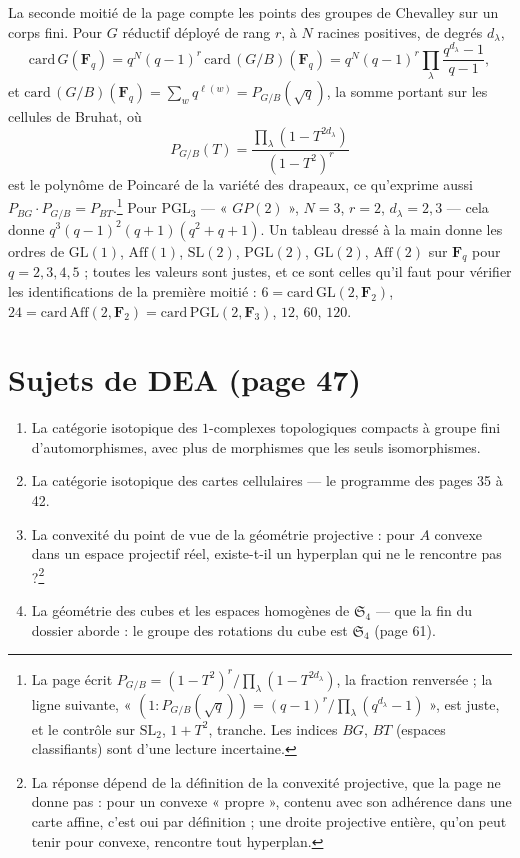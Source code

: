 \documentclass[11pt,a4paper]{article}
\begin{document}
La seconde moitié de la page compte les points des groupes de Chevalley sur
un corps fini. Pour $G$ réductif déployé de rang $r$, à $N$ racines
positives, de degrés $d_\lambda$,
\[
  \mathrm{card}\, G(\mathbf{F}_q) = q^N (q-1)^r \,\mathrm{card}\,
  (G/B)(\mathbf{F}_q) = q^N (q-1)^r \prod_\lambda \frac{q^{d_\lambda} -
  1}{q - 1} ,
\]
et $\mathrm{card}\,(G/B)(\mathbf{F}_q) = \sum_w q^{\ell(w)} =
P_{G/B}(\sqrt{q})$, la somme portant sur les cellules de Bruhat, où
\[
  P_{G/B}(T) = \frac{\prod_\lambda (1 - T^{2d_\lambda})}{(1 - T^2)^r}
\]
est le polynôme de Poincaré de la variété des drapeaux, ce qu'exprime aussi
$P_{BG} \cdot P_{G/B} = P_{BT}$.\footnote{La page écrit $P_{G/B} = (1 -
T^2)^r / \prod_\lambda (1 - T^{2d_\lambda})$, la fraction renversée ; la
ligne suivante, « $(1 : P_{G/B}(\sqrt{q})) = (q-1)^r/\prod_\lambda
(q^{d_\lambda} - 1)$ », est juste, et le contrôle sur $\mathrm{SL}_2$, $1 +
T^2$, tranche. Les indices $BG$, $BT$ (espaces classifiants) sont d'une
lecture incertaine.} Pour $\mathrm{PGL}_3$ --- « $GP(2)$ », $N = 3$, $r = 2$,
$d_\lambda = 2, 3$ --- cela donne $q^3(q-1)^2(q+1)(q^2+q+1)$. Un tableau
dressé à la main donne les ordres de $\mathrm{GL}(1)$, $\mathrm{Aff}(1)$,
$\mathrm{SL}(2)$, $\mathrm{PGL}(2)$, $\mathrm{GL}(2)$, $\mathrm{Aff}(2)$ sur
$\mathbf{F}_q$ pour $q = 2, 3, 4, 5$ ; toutes les valeurs sont justes, et ce
sont celles qu'il faut pour vérifier les identifications de la première
moitié : $6 = \mathrm{card}\, \mathrm{GL}(2, \mathbf{F}_2)$, $24 =
\mathrm{card}\, \mathrm{Aff}(2, \mathbf{F}_2) = \mathrm{card}\, \mathrm{PGL}(2,
\mathbf{F}_3)$, $12$, $60$, $120$.

\section*{Sujets de DEA (page 47)}

\begin{enumerate}
  \item[1)] La catégorie isotopique des $1$-complexes topologiques compacts
  à groupe fini d'automorphismes, avec plus de morphismes que les seuls
  isomorphismes.
  \item[2)] La catégorie isotopique des cartes cellulaires --- le programme
  des pages 35 à 42.
  \item[3)] La convexité du point de vue de la géométrie projective : pour
  $A$ convexe dans un espace projectif réel, existe-t-il un hyperplan qui ne
  le rencontre pas ?\footnote{La réponse dépend de la définition de la
  convexité projective, que la page ne donne pas : pour un convexe
  « propre », contenu avec son adhérence dans une carte affine, c'est oui par
  définition ; une droite projective entière, qu'on peut tenir pour convexe,
  rencontre tout hyperplan.}
  \item[4)] La géométrie des cubes et les espaces homogènes de
  $\mathfrak{S}_4$ --- que la fin du dossier aborde : le groupe des rotations
  du cube est $\mathfrak{S}_4$ (page 61).
\end{enumerate}
\end{document}
